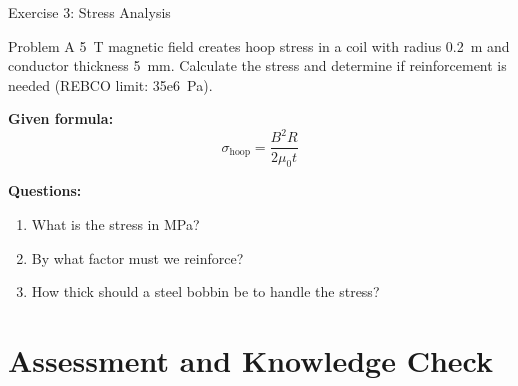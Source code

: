 \documentclass[aspectratio=169,xcolor={table,dvipsnames}]{beamer}
\newcommand{\Tesla}[1]{#1~T}
\newcommand{\Pascal}[1]{#1~Pa}
\begin{document}
\begin{frame}{Exercise 3: Stress Analysis}
    \begin{block}{Problem}
        A \Tesla{5} magnetic field creates hoop stress in a coil with radius 0.2~m
        and conductor thickness 5~mm. Calculate the stress and determine
        if reinforcement is needed (REBCO limit: \Pascal{35e6}).
    \end{block}
    
    \vspace{0.3cm}
    \textbf{Given formula:}
    \begin{equation}
        \sigma_{\text{hoop}} = \frac{B^2 R}{2 \mu_0 t}
    \end{equation}
    
    \vspace{0.3cm}
    \textbf{Questions:}
    \begin{enumerate}
        \item What is the stress in MPa?
        \item By what factor must we reinforce?
        \item How thick should a steel bobbin be to handle the stress?
    \end{enumerate}
\end{frame}

\section{Assessment and Knowledge Check}
\end{document}
